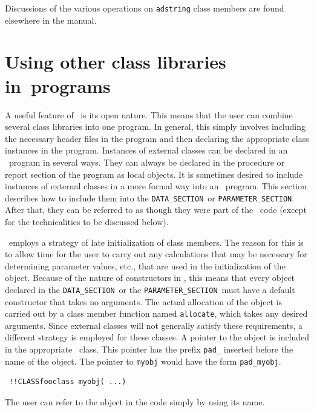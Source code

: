 \documentclass{admbmanual}
\newcommand\DS{\texttt{DATA\_SECTION}}
\newcommand\PS{\texttt{PARAMETER\_SECTION}}
\begin{document}
Discussions of the various operations on \texttt{adstring} class members are
found elsewhere in the manual.

\section{Using other class libraries in\br \ADM\ programs}

A useful feature of \cplus\ is its open nature. This means that the user can
combine several class libraries into one program. In general, this simply
involves including the necessary header files in the program and then declaring
the appropriate class instances in the program. Instances of external classes
can be declared in an \ADM\ program in several ways. They can always be declared
in the procedure or report section of the program as local objects. It is
sometimes desired to include instances of external classes in a more formal way
into an \ADM\ program. This section describes how to include them into the \DS\
or \PS. After that, they can be referred to as though they were part of the
\ADM\ code (except for the technicalities to be discussed below).

\ADM\ employs a strategy of late initialization of class members. The reason for
this is to allow time for the user to carry out any calculations that may be
necessary for determining parameter values, etc., that are used in the
initialization of the object. Because of the nature of constructors in \cplus,
this means that every object declared in the \DS\ or the \PS\ must have a
default constructor that takes no arguments. The actual allocation of the object
is carried out by a class member function named \texttt{allocate}, which takes
any desired arguments. Since external classes will not generally satisfy these
requirements, a different strategy is employed for these classes. A pointer to
the object is included in the appropriate \ADM\ class. This pointer has the
prefix \texttt{pad\_} inserted before the name of the object. The pointer to
\texttt{myobj} would have the form \texttt{pad\_myobj}.
\begin{lstlisting}
 !!CLASSfooclass myobj( ...)
\end{lstlisting}
The user can refer to the object in the code simply by using its name.

\end{document}

